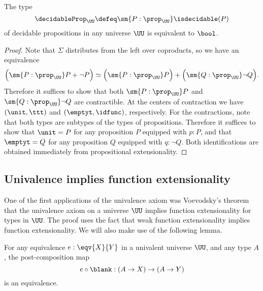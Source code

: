 \begin{cor}\label{cor:decidable-Prop}
  The type
  \begin{equation*}
    \decidableProp_\UU \defeq \sm{P:\prop_\UU}\isdecidable(P)
  \end{equation*}
  of decidable propositions in any universe $\UU$ is equivalent to $\bool$.
\end{cor}

\begin{proof}
  Note that $\Sigma$ distributes from the left over coproducts, so we have an equivalence
  \begin{equation*}
    \Big(\sm{P:\prop_\UU}P+\neg P\Big)\simeq \Big(\sm{P:\prop_\UU}P\Big)+\Big(\sm{Q:\prop_\UU}\neg Q\Big). 
  \end{equation*}
  Therefore it suffices to show that both $\sm{P:\prop_\UU}P$ and $\sm{Q:\prop_\UU}\neg Q$ are contractible. At the centers of contraction we have $(\unit,\ttt)$ and $(\emptyt,\idfunc)$, respectively. For the contractions, note that both types are subtypes of the types of propositions. Therefore it suffices to show that $\unit=P$ for any proposition $P$ equipped with $p:P$, and that $\emptyt=Q$ for any proposition $Q$ equipped with $q:\neg Q$. Both identifications are obtained immediately from propositional extensionality.
\end{proof}

\subsection{Univalence implies function extensionality}
One of the first applications of the univalence axiom was Voevodsky's theorem that the univalence axiom on a universe $\UU$ implies function extensionality for types in $\UU$. The proof uses the fact that weak function extensionality implies function extensionality. We will also make use of the following lemma. 

\begin{lem}\label{lem:postcomp-equiv}
  For any equivalence $e:\eqv{X}{Y}$ in a univalent universe $\UU$, and any type $A$, the post-composition map
  \begin{equation*}
    e\circ\blank : (A \to X) \to (A\to Y)
  \end{equation*}
  is an equivalence.
\end{lem}

